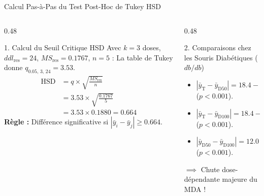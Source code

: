 \documentclass[aspectratio=169,10pt]{beamer}
\begin{document}
\begin{frame}{Calcul Pas-à-Pas du Test Post-Hoc de Tukey HSD}
  \begin{columns}[onlytextwidth, T]
    \begin{column}{0.48\linewidth}
      \begin{conceptbox}{1. Calcul du Seuil Critique HSD}
        \small
        Avec $k = 3$ doses, $ddl_{\text{res}} = 24$, $MS_{\text{res}} = 0.1767$, $n = 5$ :
        La table de Tukey donne $q_{0.05, \, 3, \, 24} = \mathbf{3.53}$.
        \begin{align*}
          \text{HSD} &= q \times \sqrt{\frac{MS_{\text{res}}}{n}} \\
          &= 3.53 \times \sqrt{\frac{0.1767}{5}} \\
          &= 3.53 \times 0.1880 = \mathbf{0.664}
        \end{align*}
        \textbf{Règle :} Différence significative si $|\bar{y}_i - \bar{y}_j| \ge 0.664$.
      \end{conceptbox}
    \end{column}
    \begin{column}{0.48\linewidth}
      \begin{biobox}{2. Comparaisons chez les Souris Diabétiques ($db/db$)}
        \small
        \begin{itemize}
          \item $|\bar{y}_{\text{T}} - \bar{y}_{\text{D50}}| = 18.4 - 12.0 = \mathbf{6.40} \ge 0.664$ ($p < 0.001$).
          \item $|\bar{y}_{\text{T}} - \bar{y}_{\text{D100}}| = 18.4 - 7.6 = \mathbf{10.80} \ge 0.664$ ($p < 0.001$).
          \item $|\bar{y}_{\text{D50}} - \bar{y}_{\text{D100}}| = 12.0 - 7.6 = \mathbf{4.40} \ge 0.664$ ($p < 0.001$).
        \end{itemize}
        $\implies$ Chute dose-dépendante majeure du MDA !
      \end{biobox}
    \end{column}
  \end{columns}
\end{frame}
\end{document}
